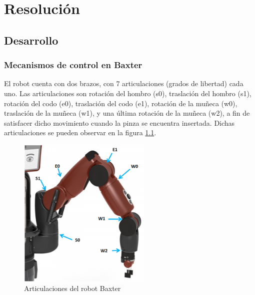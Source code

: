 
\chapter{Resolución}
\section{Desarrollo}
\subsection{Mecanismos de control en Baxter}
El robot cuenta con dos brazos, con 7 articulaciones (grados de libertad) cada uno. Las articulaciones son rotación del hombro (s0), traslación del hombro (s1), rotación del codo (e0), traslación del codo (e1), rotación de la muñeca (w0), traslación de la muñeca (w1), y una última rotación de la muñeca (w2), a fin de satisfacer dicho movimiento cuando la pinza se encuentra insertada. Dichas articulaciones se pueden observar en la figura \ref{fig:desarrollo/joints}.

\begin{figure}[]
	\centering
	\includegraphics[width=2.5in]{imagenes/desarrollo/baxter_joint_names.png}
	\caption{Articulaciones del robot Baxter}
	\label{fig:desarrollo/joints}
\end{figure}

